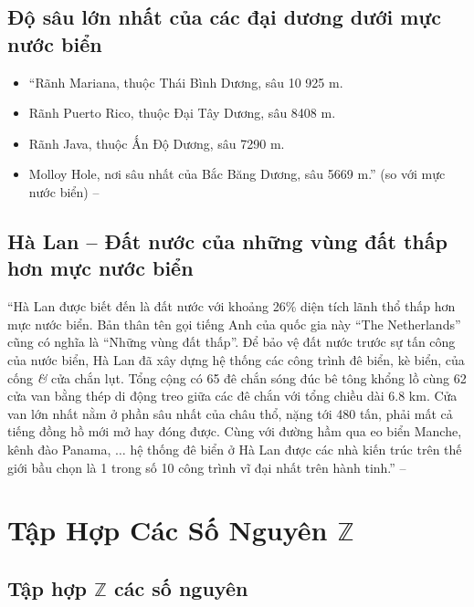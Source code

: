 \documentclass[oneside]{book}
\numberwithin{equation}{section}
\begin{document}
\subsection{Độ sâu lớn nhất của các đại dương dưới mực nước biển}
\begin{itemize}
	\item ``Rãnh Mariana, thuộc Thái Bình Dương, sâu 10 925 m.
	\item Rãnh Puerto Rico, thuộc Đại Tây Dương, sâu 8408 m.
	\item Rãnh Java, thuộc Ấn Độ Dương, sâu 7290 m.
	\item Molloy Hole, nơi sâu nhất của Bắc Băng Dương, sâu 5669 m.'' (so với mực nước biển) -- \cite[p. 63]{Thai_Anh_Dat_Ha_Loan_Nam_Quang_Toan_6_tap_1}
\end{itemize}

\subsection{Hà Lan -- Đất nước của những vùng đất thấp hơn mực nước biển}
``Hà Lan được biết đến là đất nước với khoảng 26\% diện tích lãnh thổ thấp hơn mực nước biển. Bản thân tên gọi tiếng Anh của quốc gia này ``The Netherlands'' cũng có nghĩa là ``Những vùng đất thấp''. Để bảo vệ đất nước trước sự tấn công của nước biển, Hà Lan đã xây dựng hệ thống các công trình đê biển, kè biển, của cống \textit{\&} cửa chắn lụt. Tổng cộng có 65 đê chắn sóng đúc bê tông khổng lồ cùng 62 cửa van bằng thép di động treo giữa các đê chắn với tổng chiều dài 6.8 km. Cửa van lớn nhất nằm ở phần sâu nhất của châu thổ, nặng tới 480 tấn, phải mất cả tiếng đồng hồ mới mở hay đóng được. Cùng với đường hầm qua eo biển Manche, kênh đào Panama, $\ldots$ hệ thống đê biển ở Hà Lan được các nhà kiến trúc trên thế giới bầu chọn là 1 trong số 10 công trình vĩ đại nhất trên hành tinh.'' -- \cite[p. 63]{Thai_Anh_Dat_Ha_Loan_Nam_Quang_Toan_6_tap_1}


\section{Tập Hợp Các Số Nguyên $\mathbb{Z}$}

\subsection{Tập hợp $\mathbb{Z}$ các số nguyên}
\end{document}
